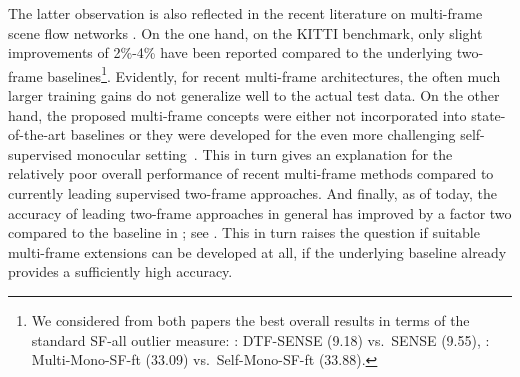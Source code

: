 \documentclass[10pt,twocolumn,letterpaper]{article}
\newcommand{\skipping}[1]{}
\begin{document}
The latter observation is also reflected in the recent literature on
multi-frame scene flow networks \cite{Schuster2021_DTF,Hur2021_MonoSceneFlow}. 
On the one hand, on the KITTI benchmark,
only slight improvements of 2\%-4\% have been reported compared to the underlying two-frame baselines\footnote{We considered from both papers the best overall results in terms of the standard SF-all outlier measure:
\cite{Schuster2021_DTF}: DTF-SENSE (9.18) vs.\ SENSE (9.55),
\cite{Hur2021_MonoSceneFlow}: Multi-Mono-SF-ft (33.09) vs.\ Self-Mono-SF-ft (33.88).}.
Evidently,  for recent multi-frame architectures, the often much larger training gains  
do not generalize well to the actual test data.
On the other hand, the proposed multi-frame concepts were either not incorporated into state-of-the-art
baselines \cite{Schuster2021_DTF} or they were developed for the even more challenging self-supervised monocular setting~\cite{Hur2021_MonoSceneFlow}.
This in turn gives an explanation for the relatively poor overall performance of recent multi-frame methods 
compared to currently leading supervised two-frame approaches.
And finally, as of today, the accuracy of leading two-frame approaches in general has improved by a factor two compared to the baseline in \cite{Schuster2021_DTF}; see \eg \cite{Liu2022_camliflow,Yang2021_SegmentRigid,Teed2020_RAFT}. This in turn raises the question
if suitable multi-frame extensions can be developed at all, if the underlying baseline already provides a sufficiently high accuracy.














\skipping{
In view of the aforementioned progress in scene flow estimation,
it is surprising that currently leading neural networks are limited to two time frames
\cite{Badki2021_binaryTTC,Li2021_acosf,Ma2019_DRISF,Teed2021_RAFT3D,Yang2020_opticalexpansion,Yang2021_SegmentRigid,Liu2022_camliflow}.
However, although temporal information is likely to to improve the results, developing suitable network architectures is a difficult task; see \eg \cite{Hur2021_MonoSceneFlow}. 
Hence, to benefit from \mbox{recent} advances in the two-frame case, the trend in current multi-frame networks goes towards extending existing architectures by suitable temporal concepts. Such concepts include the propagation of motion object labels over time \cite{Neoral2017_SceneFlowTemporal}, the integration of a trainable motion inverter that allows to generate predictions from the past \cite{Schuster2021_DTF} as well as the use of double cost volumes combined with  convolutional LSTMs to propagate the hidden state over time \cite{Hur2021_MonoSceneFlow}.
}
\end{document}
